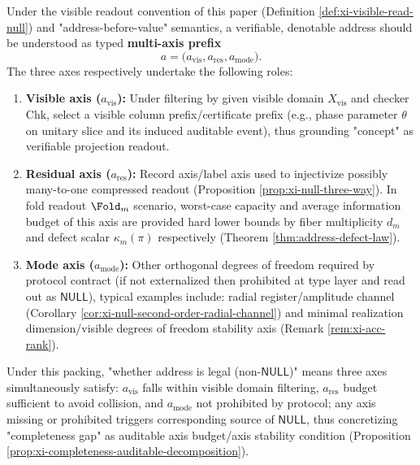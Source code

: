 \begin{definition}\label{def:multi_axis_address}
Under the visible readout convention of this paper (Definition \ref{def:xi-visible-read-null}) and "address-before-value" semantics, a verifiable, denotable address should be understood as typed \textbf{multi-axis prefix}
\[
a=\bigl(a_{\mathrm{vis}},a_{\mathrm{res}},a_{\mathrm{mode}}\bigr).
\]
The three axes respectively undertake the following roles:
\begin{enumerate}
  \item \textbf{Visible axis (\(a_{\mathrm{vis}}\)):} Under filtering by given visible domain \(X_{\mathrm{vis}}\) and checker \(\mathrm{Chk}\), select a visible column prefix/certificate prefix (e.g., phase parameter \(\theta\) on unitary slice and its induced auditable event), thus grounding "concept" as verifiable projection readout.
  \item \textbf{Residual axis (\(a_{\mathrm{res}}\)):} Record axis/label axis used to injectivize possibly many-to-one compressed readout (Proposition \ref{prop:xi-null-three-way}). In fold readout \(\Fold_m\) scenario, worst-case capacity and average information budget of this axis are provided hard lower bounds by fiber multiplicity \(d_m\) and defect scalar \(\kappa_m(\pi)\) respectively (Theorem \ref{thm:address-defect-law}).
  \item \textbf{Mode axis (\(a_{\mathrm{mode}}\)):} Other orthogonal degrees of freedom required by protocol contract (if not externalized then prohibited at type layer and read out as \(\mathsf{NULL}\)), typical examples include: radial register/amplitude channel (Corollary \ref{cor:xi-null-second-order-radial-channel}) and minimal realization dimension/visible degrees of freedom stability axis (Remark \ref{rem:xi-acc-rank}).
\end{enumerate}
\par
Under this packing, "whether address is legal (non-\(\mathsf{NULL}\))" means three axes simultaneously satisfy: \(a_{\mathrm{vis}}\) falls within visible domain filtering, \(a_{\mathrm{res}}\) budget sufficient to avoid collision, and \(a_{\mathrm{mode}}\) not prohibited by protocol; any axis missing or prohibited triggers corresponding source of \(\mathsf{NULL}\), thus concretizing "completeness gap" as auditable axis budget/axis stability condition (Proposition \ref{prop:xi-completeness-auditable-decomposition}).
\end{definition}

